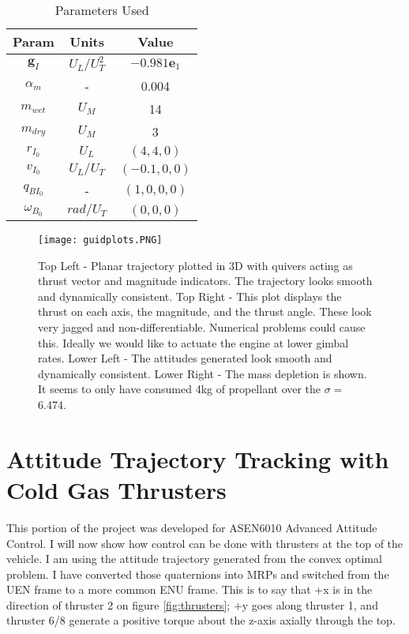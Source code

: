 \documentclass[conf]{new-aiaa}
\begin{document}
\begin{singlespace}
\begin{table}[ht]
\caption{Parameters Used}
\centering 
\begin{tabular}{c c c} 
\hline\hline
Param & Units & Value \\ [0.5ex] 
\hline 
$\mathbf{g}_I$ 		& $U_L/U_T^2$ 	& $-0.981\mathbf{e}_1$ 		\\ 
$\alpha_{\dot{m}}$ 	& - 			& 0.004 							\\
$m_{wet}$ 			& $U_M$ 		& 14		 					\\
$m_{dry}$ 			& $U_M$ 		& 3  						\\
$r_{I_0}$ 			& $U_L$ 		& $(4,4,0)$ 							\\
$v_{I_0}$ 			& $U_L/U_T$	 	& $(-0.1,0,0)$ 							\\
$q_{{BI}_0}$ 		& - 			& $(1,0,0,0)$ 							\\
$\omega_{B_0}$ 		& $rad/U_T$ 			& $(0,0,0)$ 							\\[1ex] 
\hline
\end{tabular}
\label{table:nonlin}
\end{table}


\begin{figure}[!htbp] 
  \centering
  \texttt{[image: guidplots.PNG]}
  \caption{Top Left - Planar trajectory plotted in 3D with quivers acting as thrust vector and magnitude indicators. The trajectory looks smooth and dynamically consistent. Top Right - This plot displays the thrust on each axis, the magnitude, and the thrust angle. These look very jagged and non-differentiable. Numerical problems could cause this. Ideally we would like to actuate the engine at lower gimbal rates. Lower Left - The attitudes generated look smooth and dynamically consistent. Lower Right - The mass depletion is shown. It seems to only have consumed 4kg of propellant over the $\sigma=$ 6.474.}
  \label{fig:guidplots}
 \end{figure}


\section{Attitude Trajectory Tracking with Cold Gas Thrusters}
This portion of the project was developed for ASEN6010 Advanced Attitude Control. I will now show how control can be done with thrusters at the top of the vehicle. I am using the attitude trajectory generated from the convex optimal problem. I have converted those quaternions into MRPs and switched from the UEN frame to a more common ENU frame. This is to say that +x is in the direction of thruster 2 on figure \ref{fig:thrusters}; +y goes along thruster 1, and thruster 6/8 generate a positive torque about the z-axis axially through the top.


\end{singlespace}
\end{document}
